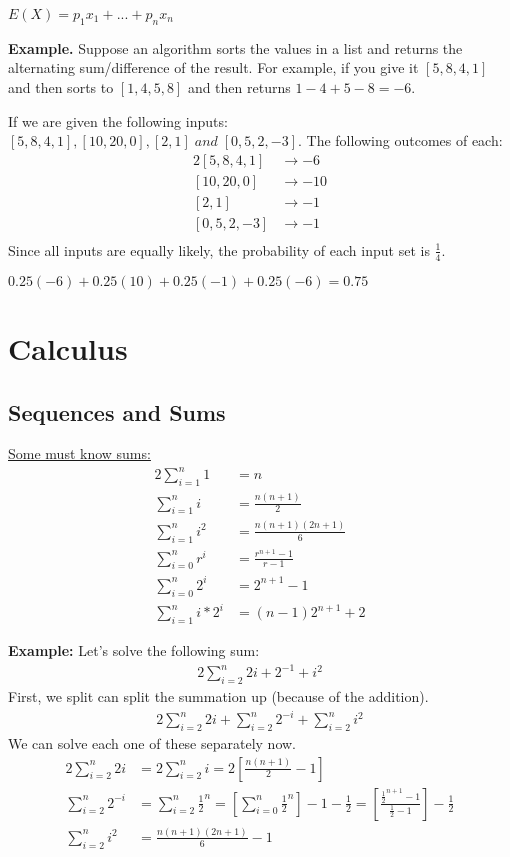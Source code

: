 \documentclass{article}
\begin{document}
\begin{center}
  $E(X) = p_1x_1 + ... + p_nx_n $
\end{center}

\textbf{Example.} Suppose an algorithm sorts the values in a list and returns the alternating sum/difference 
of the result. For example, if you give it $[5,8,4,1]$ and then sorts to $[1,4,5,8]$ and then returns $1-4+5-8=-6$.

If we are given the following inputs: $[5, 8, 4, 1], [10, 20, 0], [2, 1]\;and\;[0, 5, 2, -3]$.
The following outcomes of each: 
\begin{alignat*}{2}
  [5,8,4,1] &\rightarrow -6\\
  [10,20,0] &\rightarrow -10\\
  [2,1] &\rightarrow -1\\
  [0,5,2,-3] &\rightarrow -1\\
\end{alignat*}
Since all inputs are equally likely, the probability of each input set is $\frac{1}{4}$.
\begin{center}
$0.25(-6) + 0.25(10) + 0.25(-1) + 0.25(-6) = 0.75$
\end{center}
\section{Calculus}
\subsection{Sequences and Sums}
\underline{Some must know sums:}
\begin{alignat*}{2}
  \sum_{i=1}^n 1 &= n \\
  \sum_{i=1}^n i &= \frac{n(n+1)}{2}\\
  \sum_{i=1}^n i^2 &= \frac{n(n+1)(2n+1)}{6}\\
  \sum_{i=0}^n r^i &= \frac{r^{n+1} - 1}{r-1} \\ 
  \sum_{i=0}^n 2^i &= 2^{n+1} - 1\\
  \sum_{i=1}^n i*2^i &= (n-1)2^{n+1} + 2
\end{alignat*}

\textbf{Example:} Let's solve the following sum:
\begin{alignat*}{2}
  \sum_{i=2}^n 2i + 2^{-1}+i^2
\end{alignat*}
First, we split can split the summation up (because of the addition).
\begin{alignat*}{2}
  \sum_{i=2}^n 2i + \sum_{i=2}^n2^{-i} + \sum_{i=2}^ni^2
\end{alignat*}
We can solve each one of these separately now.
\begin{alignat*}{2}
  \sum_{i=2}^n 2i &= 2\sum_{i=2}^n i = 2 \left[\frac{n(n+1)}{2} - 1\right] \\
  \sum_{i=2}^n 2^{-i} &= \sum_{i=2}^n \frac{1}{2}^n = \left[\sum_{i=0}^n \frac{1}{2}^n \right] - 1 
  - \frac{1}{2} = \left[\frac{\frac{1}{2}^{n+1} - 1}{\frac{1}{2}-1}\right] - \frac{1}{2} \\
  \sum_{i=2}^n i^2 &= \frac{n(n+1)(2n+1)}{6} - 1
\end{alignat*}
\end{document}
